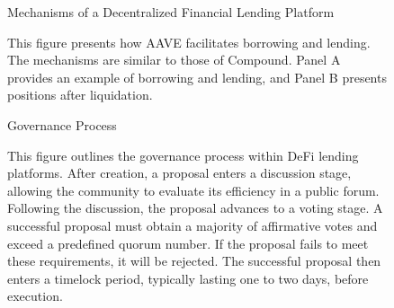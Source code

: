 \clearpage
\newpage
\begin{figure}[ht!]
\centering
\caption{Mechanisms of a Decentralized Financial Lending Platform}\label{fig:mechanism}
\caption*{This figure presents how AAVE facilitates borrowing and lending. The mechanisms are similar to those of Compound. Panel A provides an example of borrowing and lending, and Panel B presents positions after liquidation. }
\bigskip
{}

\bigskip
{}

\end{figure}

\clearpage
\newpage

\begin{figure}[ht!]
\centering
\caption{Governance Process}\label{fig:governance}
\caption*{This figure outlines the governance process within DeFi lending platforms. After creation, a proposal enters a discussion stage, allowing the community to evaluate its efficiency in a public forum. Following the discussion, the proposal advances to a voting stage. A successful proposal must obtain a majority of affirmative votes and exceed a predefined quorum number. If the proposal fails to meet these requirements, it will be rejected. The successful proposal then enters a timelock period, typically lasting one to two days, before execution. }

\end{figure}

